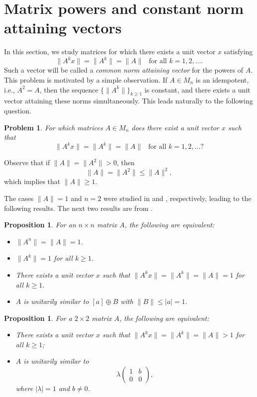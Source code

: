 \documentclass[11pt]{article}
\newtheorem{proposition}[theorem]{Proposition}
\newtheorem{problem}[theorem]{Problem}
\numberwithin{equation}{section}
\begin{document}
\section{Matrix powers and constant norm attaining vectors}

In this section, we study matrices for which there exists a unit vector
$x$ satisfying
\[
\|A^k x\| = \|A^k\| = \|A\| \  \  \mbox{ for all } k = 1,2,\ldots.
\]
Such a vector will be called a \emph{common norm attaining vector} for the powers of $A$.
This problem is motivated by a simple observation.
If $A \in M_n$ is an idempotent, i.e.,  $A^2 = A$, then the sequence $\{\|A^k\|\}_{k \ge 1}$ is
constant, and there exists
a unit vector attaining these norms simultaneously. This leads naturally to the following question.

\begin{problem} \label{prob}
For which matrices $A \in M_n$ does there exist a unit vector $x$ such that
\[
\|A^k x\| = \|A^k\| = \|A\| \  \  \mbox{ for all } k = 1,2,\ldots?
\]
\end{problem}

Observe that if $\|A\| = \|A^2\| > 0$, then
\[
\|A\| = \|A^2\| \le \|A\|^2 ,
\]
which implies that $\|A\| \ge 1$.

The cases $\|A\| = 1$ and $n = 2$ were studied in \cite{GWW} and \cite{P}, respectively, leading to the following results.
The next two results are from \cite[Corollary 2.6 and Proposition 3.2 (b)]{GWW}.


\begin{proposition}\label{prop41}
For an $n \times n$ matrix $A$, the following are equivalent:
\begin{itemize}
\item[\rm (a)] $\|A^n\| = \|A\| = 1$.
\item[\rm (b)] $\|A^k\| = 1$ for all $k \ge 1$.
\item[\rm (c)] There exists a unit vector $x$ such that $\|A^k x\| = \|A^k\| = \|A\| = 1$ for all $k \ge 1$.
\item[\rm (d)] $A$ is unitarily similar to $[a] \oplus B$ with $\|B\| \le |a| = 1$.
\end{itemize}
\end{proposition}

\begin{proposition}\label{prop42}
For a $2 \times 2$ matrix $A$, the following are equivalent:
\begin{itemize}
\item[\rm (a)] There exists a unit vector $x$ such that $\|A^k x\| = \|A^k\| = \|A\| > 1$ for all $k \ge 1$;
\item[\rm (b)] $A$ is unitarily similar to
\[
\lambda \begin{pmatrix}
1 & b \\
0 & 0
\end{pmatrix},
\]
where $|\lambda| = 1$ and $b \neq 0$.
\end{itemize}
\end{proposition}
\end{document}
